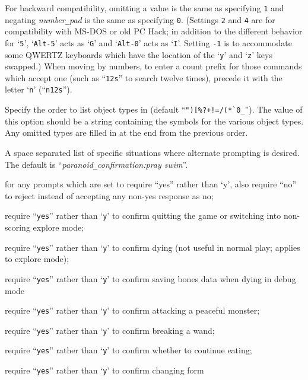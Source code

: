 For backward compatibility, omitting a value is the same as specifying {\tt 1}
and negating
{\it number\verb+_+pad\/}
is the same as specifying {\tt 0}.
(Settings {\tt 2} and {\tt 4} are for compatibility with MS-DOS or old PC Hack;
in addition to the different behavior for `{\tt 5}', `{\tt Alt-5}' acts as `{\tt G}'
and `{\tt Alt-0}' acts as `{\tt I}'.
Setting {\tt -1} is to accommodate some QWERTZ keyboards which have the
location of the `{\tt y}' and `{\tt z}' keys swapped.)
When moving by numbers, to enter a count prefix for those commands
which accept one (such as ``{\tt 12s}'' to search twelve times), precede it
with the letter `{\tt n}' (``{\tt n12s}'').
\item[\ib{packorder}]
Specify the order to list object types in (default
``\verb&")[%?+!=/(*`0_&''). The value of this option should be a string
containing the symbols for the various object types.  Any omitted types
are filled in at the end from the previous order.
\item[\ib{paranoid\verb+_+confirmation}]
A space separated list of specific situations where alternate
prompting is desired.  The default is ``{\it paranoid\verb+_+confirmation:pray swim}''.
\newlength{\pcwidth}
\settowidth{\pcwidth}{\tt Were-change}
\addtolength{\pcwidth}{\labelsep}
\blist{\leftmargin \pcwidth \topsep 1mm \itemsep 0mm}
\item[{\tt Confirm}]
for any prompts which are set to require ``yes''
rather than `y', also require ``no'' to reject instead
of accepting any non-yes response as no;
\item[{\tt quit~~~}]
require ``{\tt yes}'' rather than `{\tt y}' to confirm quitting
the game or switching into non-scoring explore mode;
\item[{\tt die~~~~}]
require ``{\tt yes}'' rather than `{\tt y}' to confirm dying (not
useful in normal play; applies to explore mode);
\item[{\tt bones~~}]
require ``{\tt yes}'' rather than `{\tt y}' to confirm saving
bones data when dying in debug mode
\item[{\tt attack~}]
require ``{\tt yes}'' rather than `{\tt y}' to confirm attacking
a peaceful monster;
\item[{\tt wand-break}]
require ``{\tt yes}'' rather than `{\tt y}' to confirm breaking
a wand;
\item[{\tt eating}]
require ``{\tt yes}'' rather than `{\tt y}' to confirm whether to
continue eating;
\item[{\tt Were-change}]
require ``{\tt yes}'' rather than `{\tt y}' to confirm changing form
